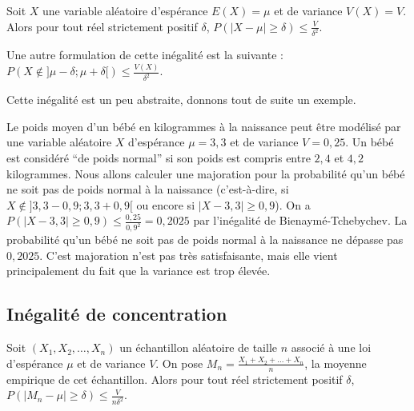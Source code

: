 	\begin{formula}
		Soit $X$ une variable aléatoire d'espérance $E(X) = \mu$ et de variance $V(X) = V$. Alors pour tout réel strictement positif $\delta$, $P(|X-\mu| \geq \delta) \leq \frac{V}{\delta^2}$.
	\end{formula}

	\begin{tip}
		Une autre formulation de cette inégalité est la suivante : $P(X \notin ]\mu - \delta; \mu + \delta[) \leq \frac{V(X)}{\delta^2}$.
	\end{tip}

	\begin{nosummary}
    Cette inégalité est un peu abstraite, donnons tout de suite un exemple.

    \begin{tip}[Exemple]
      Le poids moyen d'un bébé en kilogrammes à la naissance peut être modélisé par une variable aléatoire $X$ d'espérance $\mu = 3,3$ et de variance $V = 0,25$.
      \newpar
      Un bébé est considéré ``de poids normal'' si son poids est compris entre $2,4$ et $4,2$ kilogrammes. Nous allons calculer une majoration pour la probabilité qu'un bébé ne soit pas de poids normal à la naissance (c'est-à-dire, si $X \notin ]3,3 - 0,9; 3,3 + 0,9[$ ou encore si $|X - 3,3| \geq 0,9$).
      \newpar
      On a $P(|X - 3,3| \geq 0,9) \leq \frac{0,25}{0,9^2} = 0,2025$ par l'inégalité de Bienaymé-Tchebychev.
      \newpar
      La probabilité qu'un bébé ne soit pas de poids normal à la naissance ne dépasse pas $0,2025$.
      \newpar
      C'est majoration n'est pas très satisfaisante, mais elle vient principalement du fait que la variance est trop élevée.
    \end{tip}
  \end{nosummary}

	\subsection{Inégalité de concentration}

	\begin{formula}
		Soit $(X_1, X_2, \dots, X_n)$ un échantillon aléatoire de taille $n$ associé à une loi d'espérance $\mu$ et de variance $V$. On pose $M_n = \frac{X_1 + X_2 + \dots + X_n}{n}$, la moyenne empirique de cet échantillon.
		\newpar
		Alors pour tout réel strictement positif $\delta$, $P(|M_n - \mu| \geq \delta) \leq \frac{V}{n \delta^2}$.
	\end{formula}

